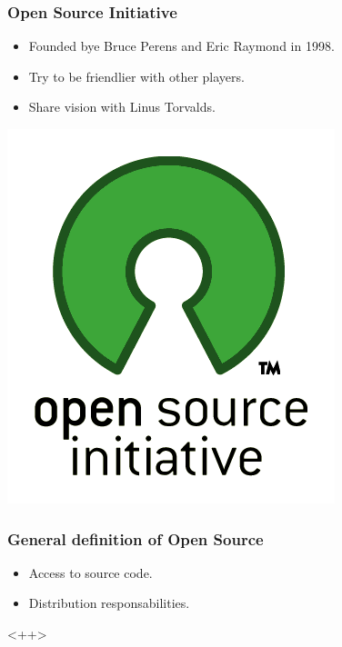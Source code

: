 \documentclass[hyperref={pdfpagelabels=false},xcolor=pst,pdf,fragile]{beamer}
\begin{document}
\begin{frame}
  \frametitle{Open Source Initiative}

  \begin{itemize}
	\item Founded bye Bruce Perens and Eric Raymond in 1998.
	\item Try to be friendlier with other players.
	\item Share vision with Linus Torvalds.
  \end{itemize}

  \begin{center}
	  \includegraphics[scale=0.3]{img/osi_standard_logo.png}
  \end{center}

\end{frame}


\begin{frame}
  \frametitle{General definition of Open Source}

  \begin{itemize}
	\item Access to source code.
	\item Distribution responsabilities.
  \end{itemize}<++>

\end{frame}
\end{document}
